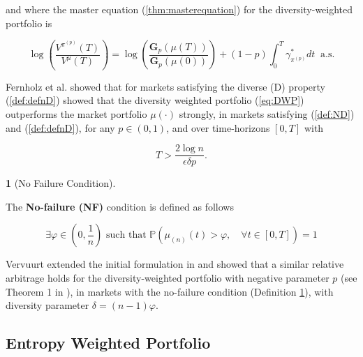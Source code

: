 \documentclass[british]{amsart}
\numberwithin{equation}{section}
\numberwithin{figure}{section}
\theoremstyle{plain}
\theoremstyle{definition}
\newtheorem{defn}[thm]{\protect\definitionname}
\theoremstyle{plain}
\theoremstyle{plain}
\theoremstyle{plain}
\theoremstyle{remark}
\theoremstyle{plain}
\providecommand{\definitionname}{Definition}
\newcommand{\measure}{\mathbb{P}}
\begin{document}
and where the master equation (\ref{thm:masterequation}) for the diversity-weighted portfolio is

	\begin{equation}
		\log\left(\frac{V^{\pi^{(p)}}(T)}{V^{\mu}(T)}\right)=\log\left(\frac{\mathbf{G}_{p}(\mu(T))}{\mathbf{G}_{p}(\mu(0))}\right)+(1-p)\int_{0}^{T}\gamma_{\pi^{(p)}}^{*}dt\;\;\text{a.s.}
	\end{equation}

Fernholz et al. \cite{Fernholz2005a} showed that for markets satisfying the diverse (D) property (\ref{def:defnD}) showed that the diversity weighted portfolio (\ref{eq:DWP}) outperforms the market portfolio $\mu(\cdot)$ strongly, in markets satisfying (\ref{def:ND}) and (\ref{def:defnD}), for any $p\in(0,1)$, and over time-horizons $[0,T]$ with 

\begin{equation}
	T>\frac{2\log n}{\epsilon\delta p}.
\end{equation}

\begin{defn} [No Failure Condition]
	\label{def:NF}

The \textbf{No-failure (NF) }condition is defined as follows

	\begin{equation}
		\exists\varphi\in(0,\frac{1}{n}) \text{ such that }
			\measure \left( \mu_{(n)}(t) > \varphi, \quad \forall t\in[0,T] \right) = 1
	\end{equation}

\end{defn}

Vervuurt extended the initial formulation in \cite{vervuurt2015} and showed that a similar relative arbitrage holds for the diversity-weighted portfolio with negative parameter $p$ (see Theorem 1 in \cite{vervuurt2015}), in markets with the no-failure condition (Definition \ref{def:NF}), with diversity parameter $\delta=(n-1)\varphi$.

\newpage

\subsection{Entropy Weighted Portfolio}
\end{document}
